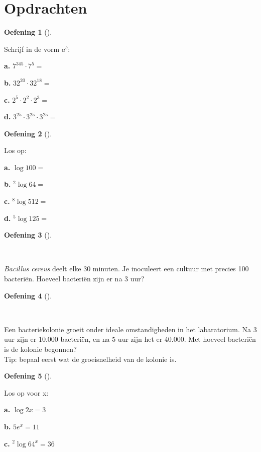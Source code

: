 \documentclass[
  a4paper,
]{scrbook}
\theoremstyle{definition}
\newtheorem{exercise}{Oefening}[chapter]
\theoremstyle{remark}
\begin{document}
\hypertarget{opdrachten-2}{%
\section{Opdrachten}\label{opdrachten-2}}

\begin{exercise}[]\protect\hypertarget{exr-exp-1}{}\label{exr-exp-1}

Schrijf in de vorm \(a^b\):

\textbf{a.} \(7^{345} \cdot 7^5 =\)

\textbf{b.} \(32^{20} \cdot 32^{18} =\)

\textbf{c.} \(2^5 \cdot 2^2 \cdot 2^3 =\)

\textbf{d.} \(3^{25} \cdot 3^{25} \cdot 3^{25} =\)

\end{exercise}

\begin{exercise}[]\protect\hypertarget{exr-exp-2}{}\label{exr-exp-2}

Los op:

\textbf{a.} \(\log{100} =\)

\textbf{b.} \(^2\log{64} =\)

\textbf{c.} \(^8\log{512} =\)

\textbf{d.} \(^5\log{125} =\)

\end{exercise}

\begin{exercise}[]\protect\hypertarget{exr-exp-3}{}\label{exr-exp-3}

~

\emph{Bacillus cereus} deelt elke 30 minuten. Je inoculeert een cultuur
met precies 100 bacteriën. Hoeveel bacteriën zijn er na 3 uur?

\end{exercise}

\begin{exercise}[]\protect\hypertarget{exr-exp-4}{}\label{exr-exp-4}

~

Een bacteriekolonie groeit onder ideale omstandigheden in het
labaratorium. Na 3 uur zijn er 10.000 bacteriën, en na 5 uur zijn het er
40.000. Met hoeveel bacteriën is de kolonie begonnen?\\
Tip: bepaal eerst wat de groeisnelheid van de kolonie is.

\end{exercise}

\begin{exercise}[]\protect\hypertarget{exr-exp-5}{}\label{exr-exp-5}

Los op voor x:

\textbf{a.} \(\log{2x} = 3\)

\textbf{b.} \(5e^x=11\)

\textbf{c.} \(^2\log{64^x}=36\)

\end{exercise}
\end{document}
